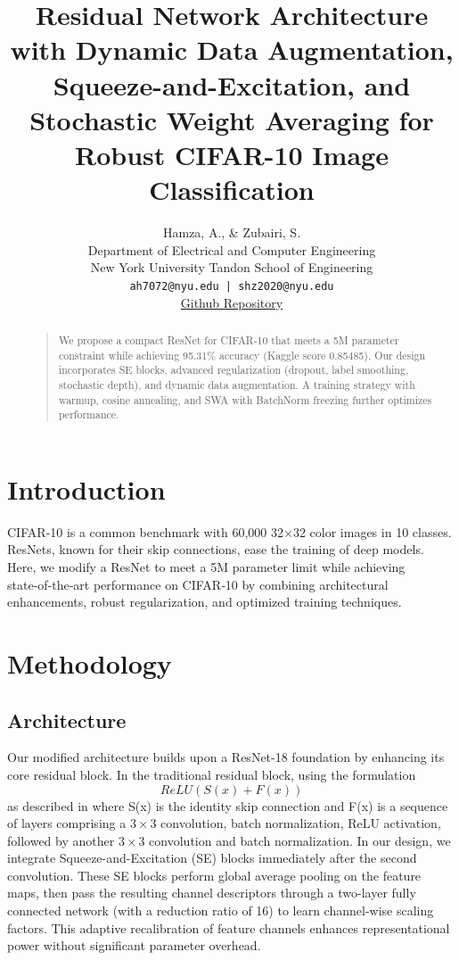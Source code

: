 \documentclass[letterpaper]{article}
\begin{document}
\title{Residual Network Architecture with Dynamic Data Augmentation, Squeeze-and-Excitation, and Stochastic Weight Averaging for Robust CIFAR-10 Image Classification}
\author{Hamza, A., \& Zubairi, S. \\
Department of Electrical and Computer Engineering\\
New York University Tandon School of Engineering\\
\texttt{ah7072@nyu.edu | shz2020@nyu.edu}\\
\href{https://github.com/saadhzubairi/deep-learning-mini-projects}{Github Repository}
}
\maketitle
\begin{abstract}
\begin{quote}
We propose a compact ResNet for CIFAR‑10 that meets a 5M parameter constraint while achieving 95.31\% accuracy (Kaggle score 0.85485). Our design incorporates SE blocks, advanced regularization (dropout, label smoothing, stochastic depth), and dynamic data augmentation. A training strategy with warmup, cosine annealing, and SWA with BatchNorm freezing further optimizes performance.
\end{quote}
\end{abstract}
\section{Introduction}
CIFAR‑10 is a common benchmark with 60,000 32×32 color images in 10 classes. ResNets, known for their skip connections, ease the training of deep models. Here, we modify a ResNet to meet a 5M parameter limit while achieving state‑of‑the‑art performance on CIFAR‑10 by combining architectural enhancements, robust regularization, and optimized training techniques.

\section{Methodology}
\subsection{Architecture}
Our modified architecture builds upon a ResNet-18 foundation by enhancing its core residual block. In the traditional residual block, using the formulation \[ReLU(S(x)+F(x))\] as described in \cite{he2015deep} where S(x) is the identity skip connection and F(x) is a sequence of layers comprising a $3\times 3$ convolution, batch normalization, ReLU activation, followed by another $3\times 3$ convolution and batch normalization. In our design, we integrate Squeeze-and-Excitation (SE) blocks \cite{hu2018squeeze} immediately after the second convolution. These SE blocks perform global average pooling on the feature maps, then pass the resulting channel descriptors through a two-layer fully connected network (with a reduction ratio of 16) to learn channel-wise scaling factors. This adaptive recalibration of feature channels enhances representational power without significant parameter overhead.
\end{document}
